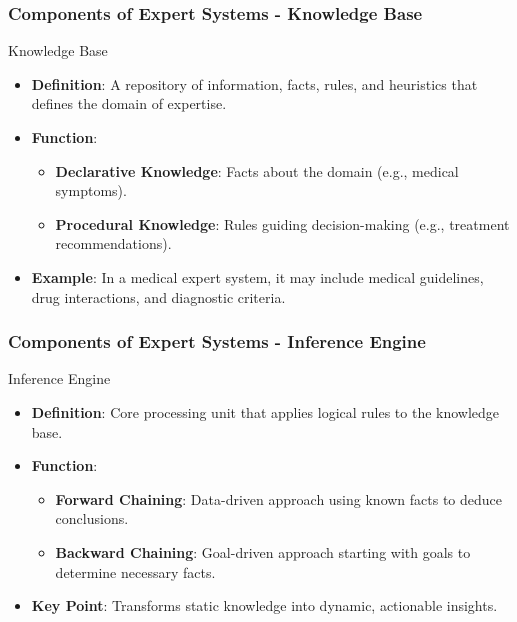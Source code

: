 \documentclass[aspectratio=169]{beamer}
\begin{document}
\begin{frame}[fragile]
    \frametitle{Components of Expert Systems - Knowledge Base}
    \begin{block}{Knowledge Base}
        \begin{itemize}
            \item \textbf{Definition}: A repository of information, facts, rules, and heuristics that defines the domain of expertise.
            \item \textbf{Function}:
            \begin{itemize}
                \item \textbf{Declarative Knowledge}: Facts about the domain (e.g., medical symptoms).
                \item \textbf{Procedural Knowledge}: Rules guiding decision-making (e.g., treatment recommendations).
            \end{itemize}
            \item \textbf{Example}: In a medical expert system, it may include medical guidelines, drug interactions, and diagnostic criteria.
        \end{itemize}
    \end{block}
\end{frame}

\begin{frame}[fragile]
    \frametitle{Components of Expert Systems - Inference Engine}
    \begin{block}{Inference Engine}
        \begin{itemize}
            \item \textbf{Definition}: Core processing unit that applies logical rules to the knowledge base.
            \item \textbf{Function}:
            \begin{itemize}
                \item \textbf{Forward Chaining}: Data-driven approach using known facts to deduce conclusions.
                \item \textbf{Backward Chaining}: Goal-driven approach starting with goals to determine necessary facts.
            \end{itemize}
            \item \textbf{Key Point}: Transforms static knowledge into dynamic, actionable insights.
        \end{itemize}
    \end{block}
\end{frame}
\end{document}
